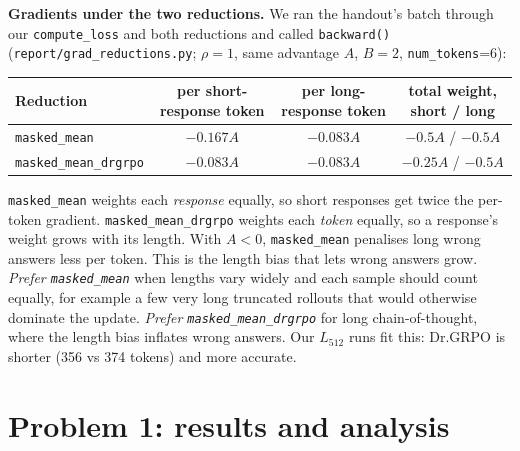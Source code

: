 \documentclass[10.5pt]{article}
\newcommand{\code}[1]{\texttt{#1}}
\begin{document}
\textbf{Gradients under the two reductions.} We ran the handout's batch through our \code{compute\_loss} and both reductions
and called \code{backward()} (\code{report/grad\_reductions.py}; $\rho=1$, same advantage $A$, $B=2$, \code{num\_tokens}=6):
\begin{center}\small
\begin{tabular}{lccc}
\toprule
Reduction & per short-response token & per long-response token & total weight, short / long\\
\midrule
\code{masked\_mean} & $-0.167A$ & $-0.083A$ & $-0.5A$ / $-0.5A$\\
\code{masked\_mean\_drgrpo} & $-0.083A$ & $-0.083A$ & $-0.25A$ / $-0.5A$\\
\bottomrule
\end{tabular}
\end{center}
\code{masked\_mean} weights each \emph{response} equally, so short responses get twice the per-token gradient.
\code{masked\_mean\_drgrpo} weights each \emph{token} equally, so a response's weight grows with its length. With $A<0$,
\code{masked\_mean} penalises long wrong answers less per token. This is the length bias that lets wrong answers grow.
\emph{Prefer \code{masked\_mean}} when lengths vary widely and each sample should count equally, for example a few very long
truncated rollouts that would otherwise dominate the update. \emph{Prefer \code{masked\_mean\_drgrpo}} for long
chain-of-thought, where the length bias inflates wrong answers. Our $L_{512}$ runs fit this: Dr.GRPO is shorter (356 vs
374 tokens) and more accurate.

\section{Problem 1: results and analysis}
\begin{table}[H]
\centering\small
{}
\caption{Accuracy on the 1,024 test prompts after 80 steps. Partial = reward 0.1, failed = 0.
$^\dagger$Correct \emph{and} using every number, as the task requires.}
\label{tab:p1}
\end{table}
\end{document}

